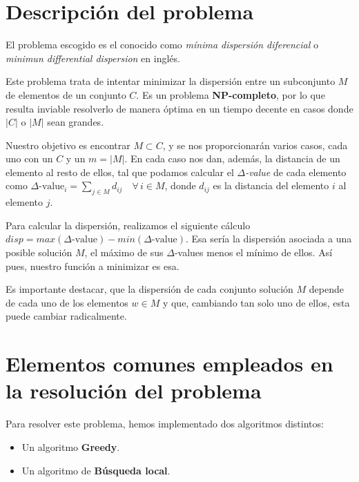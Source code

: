 \newpage %

\tableofcontents %

\listoffigures

\lstlistoflistings

\newpage

\section{Descripción del problema}

El problema escogido es el conocido como \textit{mínima dispersión diferencial} o \textit{minimun differential dispersion} en inglés.

Este problema trata de intentar minimizar la dispersión entre un subconjunto $M$ de elementos de un conjunto $C$. Es un problema \textbf{NP-completo}, por lo que resulta inviable resolverlo de manera óptima en un tiempo decente en casos donde $|C|$ o $|M|$ sean grandes.

Nuestro objetivo es encontrar $M \subset C$, y se nos proporcionarán varios casos, cada uno con un $C$ y un $m =|M|$.
En cada caso nos dan, además, la distancia de un elemento al resto de ellos, tal que podamos calcular el \textit{$\Delta$-value} de cada elemento como $\displaystyle \Delta \text{-value}_i = \sum_{j \in M}d_{ij}\quad \forall \, i \in M$, donde $d_{ij}$ es la distancia del elemento $i$ al elemento $j$.

Para calcular la dispersión, realizamos el siguiente cálculo $disp = max(\Delta\text{-value})-min(\Delta\text{-value})$. Esa sería la dispersión asociada a una posible solución $M$, el máximo de sus $\Delta$-values menos el mínimo de ellos. Así pues, nuestro función a minimizar es esa.

Es importante destacar, que la dispersión de cada conjunto solución $M$ depende de cada uno de los elementos $w \in M$ y que, cambiando tan solo uno de ellos, esta puede cambiar radicalmente.

\newpage
\section{Elementos comunes empleados en la resolución del problema}
Para resolver este problema, hemos implementado dos algoritmos distintos:
\begin{itemize}
\item Un algoritmo \textbf{Greedy}.
\item Un algoritmo de \textbf{Búsqueda local}.
\end{itemize}

